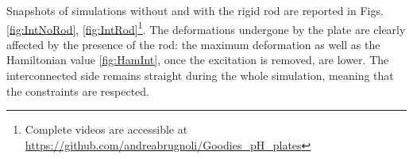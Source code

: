 \documentclass[letterpaper, 10 pt, conference]{ieeeconf}
\begin{document}
\begin{figure*}[th]
	\centering
	\hfil
	\hfil
	\caption{Snapshots at 4 different times ($t_{\text{end}} = 10 \,[ms]$) of a cantilever plate undergoing solicitation \eqref{eq:force_rod}.}
	\label{fig:IntNoRod}
\end{figure*}

\begin{figure*}[t]
	\centering
	\hfil
	\hfil
	\caption{Snapshots at 4 different times ($t_{\text{end}} = 10 \,[ms]$) of a cantilever plate undergoing solicitation \eqref{eq:force_rod}. The plate is connected to a rigid rod in $x = L_x$. Note the different deformation amplitude with respect to \ref{fig:IntNoRod}}
	\label{fig:IntRod}
\end{figure*}
Snapshots of simulations without and with the rigid rod are reported in Figs. \ref{fig:IntNoRod}, \ref{fig:IntRod}\footnote{\label{note:1}Complete videos are accessible at \url{https://github.com/andreabrugnoli/Goodies_pH_plates}}. The deformations undergone by the plate are clearly affected by the presence of the rod: the maximum deformation as well as the Hamiltonian value \ref{fig:HamInt}, once the excitation is removed, are lower. The interconnected side remains straight during the whole simulation, meaning that the constraints are respected.
\end{document}
